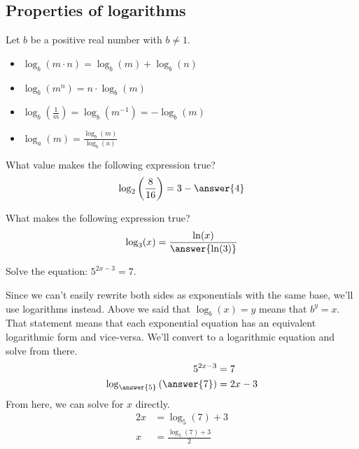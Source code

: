 \documentclass{ximera}
\begin{document}
\subsection{Properties of logarithms}
Let $b$ be a positive real number with $b\neq 1$.
\begin{itemize}
\item $\log_b(m\cdot n) = \log_b(m) + \log_b(n)$
\item $\log_b(m^n) = n\cdot \log_b(m)$
\item $\log_b\left(\frac{1}{m}\right) = \log_b(m^{-1}) = -\log_b(m)$
\item $\log_a(m) = \frac{\log_b(m)}{\log_b(a)}$
\end{itemize}

\begin{question}
  What value makes the following expression true?
  \[
  \log_2\left(\frac{8}{16}\right) = 3-\answer{4}
  \]
\end{question}


\begin{question}
  What makes the following expression true?
  \[
  \log_3(x) = \frac{\ln(x)}{\answer{\ln(3)}}
  \]
\end{question}

\begin{example}
	Solve the equation: $\displaystyle 5^{2x-3} = 7$.
	\begin{explanation}
		Since we can't easily rewrite both sides as exponentials with the same base, we'll use logarithms instead.  Above we said that
		$\log_b(x) = y$ means that $b^y = x$.  That statement means that each exponential equation has an equivalent logarithmic form
		and vice-versa.  We'll convert to a logarithmic equation and solve from there.
		\begin{align*}
			5^{2x-3} &= 7\\
			\log_{\answer{5}}\left(  \answer{7} \right) &= 2x-3
		\end{align*}
		From here, we can solve for $x$ directly.
		\begin{align*}
			2x &= \log_{5}\left(7\right) + 3\\
			x &= \frac{\log_{5}\left(7\right) + 3}{2}
		\end{align*}
	\end{explanation} 
\end{example}
\end{document}
